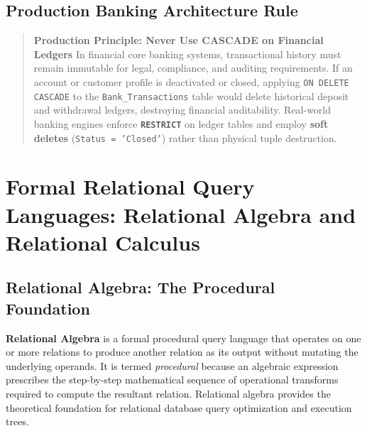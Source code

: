 \subsection{Production Banking Architecture Rule}
\begin{quote}
\textbf{Production Principle: Never Use CASCADE on Financial Ledgers}
In financial core banking systems, transactional history must remain immutable for legal, compliance, and auditing requirements. If an account or customer profile is deactivated or closed, applying \texttt{ON DELETE CASCADE} to the \texttt{Bank\_Transactions} table would delete historical deposit and withdrawal ledgers, destroying financial auditability. Real-world banking engines enforce \textbf{\texttt{RESTRICT}} on ledger tables and employ \textbf{soft deletes} (\texttt{Status = 'Closed'}) rather than physical tuple destruction.
\end{quote}



\section{Formal Relational Query Languages: Relational Algebra and Relational Calculus}
\label{sec:dbms_relational_algebra}

\subsection{Relational Algebra: The Procedural Foundation}
\textbf{Relational Algebra} is a formal procedural query language that operates on one or more relations to produce another relation as its output without mutating the underlying operands. It is termed \textit{procedural} because an algebraic expression prescribes the step-by-step mathematical sequence of operational transforms required to compute the resultant relation. Relational algebra provides the theoretical foundation for relational database query optimization and execution trees.


